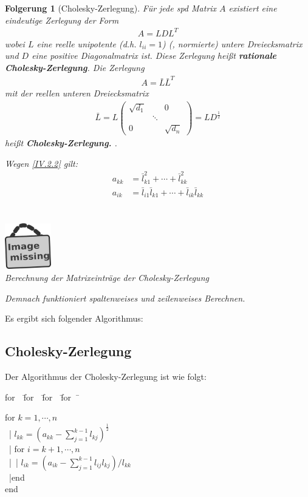\documentclass[ngerman,fontsize=11pt, paper=a4, parskip=half, titlepage=true, toc=bib]{scrbook}
\theoremstyle{definition}
\theoremstyle{plain}
\newtheorem{Fol}[Def]{Folgerung}
\newcommand{\subsectione}[1]{\addtocounter{Def}{1}\subsection{#1}}
\newenvironment{Fole}[1][]{ %
  \begin{Fol}[#1]
  }
  {
  \end{Fol}
  \addtocounter{subsection}{1}
}
\newenvironment{pseudocode}[1]{ %
  \begin{minipage}{#1}
    \begin{framed}
      \hspace*{1em}	
      \begin{minipage}{#1}
        \begin{tabbing}
          for~~\= for~~\= for~~\= for~~\= \kill
	}
	{ %
        \end{tabbing}
      \end{minipage}
      \hspace*{1em}
    \end{framed}
  \end{minipage}
}
\newcommand{\imagemissing}[1]{
  \begin{center}~\\
    \centering 
    \includegraphics[width=2cm]{images/image_missing.jpg}\\
    \textit{#1} \\
  \end{center}
}
\begin{document}
\begin{Fole}[Cholesky-Zerlegung]
  \label{4.2.2}
  Für jede spd Matrix $A$ existiert eine eindeutige Zerlegung der Form 
  \begin{gather*}
    A= LDL^T
  \end{gather*}
  wobei $L$ eine reelle unipotente (d.h. $l_{ii}=1$)  (, normierte)  untere 
  Dreiecksmatrix  und $D$ eine positive Diagonalmatrix ist. 
  Diese Zerlegung heißt \textbf{rationale Cholesky-Zerlegung}. Die Zerlegung
  \begin{gather}
    A= \bar{L}\bar{L}^T 
    \label{IV.2.2}
  \end{gather}
  mit der reellen unteren Dreiecksmatrix
  \begin{gather*}
    \bar{L} = L \begin{pmatrix}
      \sqrt{d_1} &&0 \\
      & \ddots & \\
      0&& \sqrt{d_n}
    \end{pmatrix} = LD^{\frac{1}{2}}
  \end{gather*}
  heißt \textbf{Cholesky-Zerlegung.} .
  
  Wegen \eqref{IV.2.2} gilt: 
  \begin{align}
    a_{kk} &= \bar{l}_{k1}^{2} + \cdots +  \bar{l}_{kk}^2  \label{IV.2.3} \\
    a_{ik} &= \bar{l}_{i1} \bar{l}_{k1} + \cdots + \bar{l}_{ik} \bar{l}_{kk}  \label{IV.2.4} \\
  \end{align}
  \imagemissing{Berechnung der Matrixeinträge der Cholesky-Zerlegung}
  Demnach funktioniert spaltenweises und zeilenweises Berechnen. 
\end{Fole}

Es ergibt sich folgender Algorithmus:


\subsectione{Cholesky-Zerlegung}
Der Algorithmus der Cholesky-Zerlegung ist wie folgt:

\begin{pseudocode}{0.55\linewidth}
  for  $k=1, \cdots , n$\\
  ~|\> $l_{kk} = (a_{kk}-\sum_{j=1}^{k-1}l_{kj})^{\frac{1}{2}}$ \\
  ~|\> for $i= k+1, \cdots , n$ \\
  ~|\>~|\> $l_{ik} = ( a_{ik}- \sum_{j=1}^{k-1}l_{ij} l_{kj})/{l_{kk}}$  \\
  ~|\>end\\
  end
\end{pseudocode}
\end{document}
